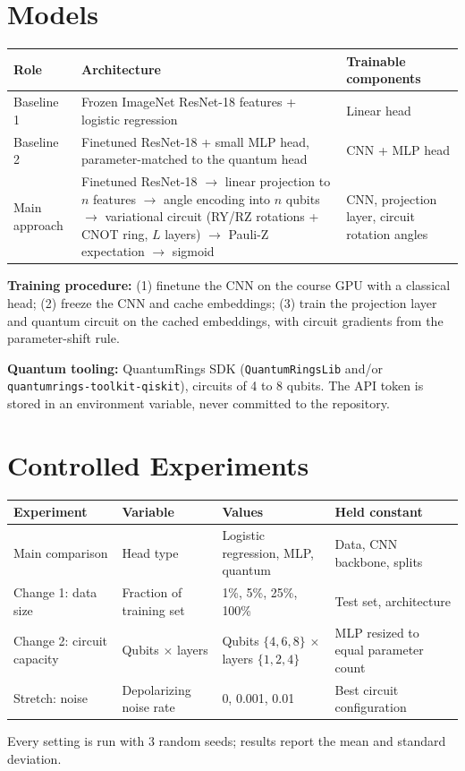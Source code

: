 \documentclass[11pt]{article}
\begin{document}
\section{Models}
\begin{center}
\begin{tabularx}{\textwidth}{@{}l Y p{3.6cm}@{}}
\toprule
\textbf{Role} & \textbf{Architecture} & \textbf{Trainable components} \\
\midrule
Baseline 1 & Frozen ImageNet ResNet-18 features + logistic regression & Linear head \\
Baseline 2 & Finetuned ResNet-18 + small MLP head, parameter-matched to the quantum head & CNN + MLP head \\
Main approach & Finetuned ResNet-18 $\rightarrow$ linear projection to $n$ features $\rightarrow$ angle encoding
  into $n$ qubits $\rightarrow$ variational circuit (RY/RZ rotations + CNOT ring, $L$ layers)
  $\rightarrow$ Pauli-Z expectation $\rightarrow$ sigmoid & CNN, projection layer, circuit rotation angles \\
\bottomrule
\end{tabularx}
\end{center}

\noindent\textbf{Training procedure:} (1) finetune the CNN on the course GPU with a classical head;
(2) freeze the CNN and cache embeddings; (3) train the projection layer and quantum circuit on the
cached embeddings, with circuit gradients from the parameter-shift rule.

\medskip
\noindent\textbf{Quantum tooling:} QuantumRings SDK (\texttt{QuantumRingsLib} and/or
\texttt{quantumrings-toolkit-qiskit}), circuits of 4 to 8 qubits. The API token is stored in an
environment variable, never committed to the repository.

\section{Controlled Experiments}
\begin{center}
\begin{tabularx}{\textwidth}{@{}p{3.2cm} p{2.8cm} Y p{3.3cm}@{}}
\toprule
\textbf{Experiment} & \textbf{Variable} & \textbf{Values} & \textbf{Held constant} \\
\midrule
Main comparison & Head type & Logistic regression, MLP, quantum & Data, CNN backbone, splits \\
Change 1: data size & Fraction of training set & 1\%, 5\%, 25\%, 100\% & Test set, architecture \\
Change 2: circuit capacity & Qubits $\times$ layers & Qubits $\{4,6,8\}$ $\times$ layers $\{1,2,4\}$ & MLP resized to equal parameter count \\
Stretch: noise & Depolarizing noise rate & 0, 0.001, 0.01 & Best circuit configuration \\
\bottomrule
\end{tabularx}
\end{center}
Every setting is run with 3 random seeds; results report the mean and standard deviation.
\end{document}
